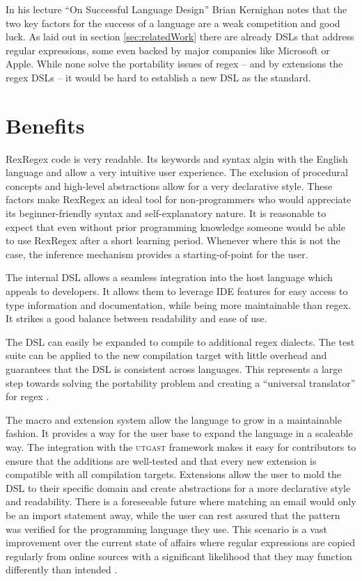 In his lecture \enquote{On Successful Language Design} \cite{OnSuccessfulLanuageDesignKernighan} Brian Kernighan notes that the two key factors for the success of a language are a weak competition and good luck. As laid out in section \ref{sec:relatedWork} there are already DSLs that address regular expressions, some even backed by major companies like Microsoft or Apple. While none solve the portability issues of regex -- and by extensions the regex DSLs -- it would be hard to establish a new DSL as the standard.

\section{Benefits}
 
RexRegex code is very readable. Its keywords and syntax algin with the English language and allow a very intuitive user experience. The exclusion of procedural concepts and high-level abstractions allow for a very declarative style. These factors make RexRegex an ideal tool for non-programmers who would appreciate its beginner-friendly syntax and self-explanatory nature. It is reasonable to expect that even without prior programming knowledge someone would be able to use RexRegex after a short learning period. Whenever where this is not the case, the inference mechanism provides a starting-of-point for the user.

The internal DSL allows a seamless integration into the host language which appeals to developers. It allows them to leverage IDE features for easy access to type information and documentation, while being more maintainable than regex. It strikes a good balance between readability and ease of use.

The DSL can easily be expanded to compile to additional regex dialects. The test suite can be applied to the new compilation target with little overhead and guarantees that the DSL is consistent across languages. This represents a large step towards solving the portability problem and creating a \enquote{universal translator} for regex \cite{RegexNotLinguaFranca}.

The macro and extension system allow the language to grow in a maintainable fashion. It provides a way for the user base to expand the language in a scaleable way. The integration with the \textsc{utgast} framework makes it easy for contributors to ensure that the additions are well-tested and that every new extension is compatible with all compilation targets. Extensions allow the user to mold the DSL to their specific domain and create abstractions for a more declarative style and readability. There is a foreseeable future where matching an email would only be an import statement away, while the user can rest assured that the pattern was verified for the programming language they use. This scenario is a vast improvement over the current state of affairs where regular expressions are copied regularly from online sources with a significant likelihood that they may function differently than intended \cite{RegexNotLinguaFranca}.

